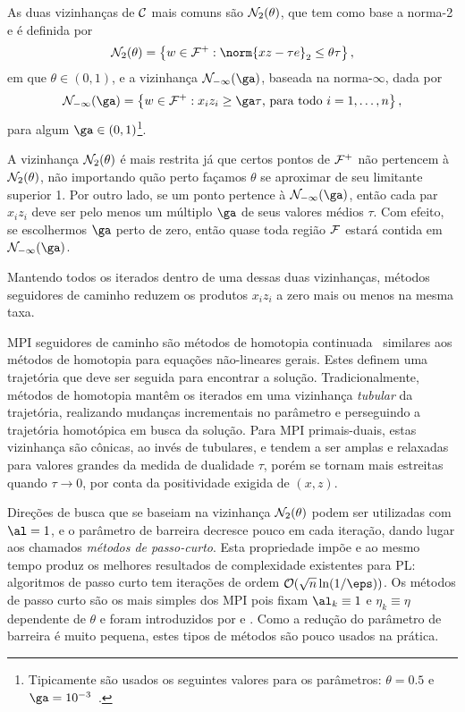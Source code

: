 As duas vizinhanças de $\mathcal{C}$ mais comuns são  $\mathcal{N}_2(\theta)$, que tem como base a norma-2 e é definida por
\[
\Nset_2(\theta) = \left\{w\in\Fset^+ : \norm{xz - \tau e}_2 \leq \theta\tau  
\right\},
\]
em que $\theta \in (0,1)$, e a vizinhança 
$\Nset_{-\infty}(\ga)$, baseada na norma-$\infty$, dada por 
\begin{equation}
\label{eq:infty-neig}
\Nset_{-\infty}(\ga) = \left\{w\in\Fset^+ : x_iz_i\geq \ga\tau\text{, para
todo }i =1,\dotsc,n \right\},
\end{equation}
para algum $\ga\in(0,1)$\footnote{Tipicamente são usados os seguintes valores 
para os parâmetros: $\theta = \num{0,5}$ e $\ga = \num{e-3}$~\cite[pg.
9]{Wright:Primal-dual-interior-point:1997h}.}.

A vizinhança $\mathcal{N}_2(\theta)$ é mais restrita já que certos pontos de $\mathcal{F}^+$
não pertencem à $\mathcal{N}_2(\theta)$, não importando quão perto façamos $\theta$ se
aproximar de seu limitante superior 1. Por outro lado, se um ponto pertence à
$\Nset_{-\infty}(\ga)$, então cada par $x_iz_i$ deve ser pelo menos um múltiplo
$\ga$ de seus valores médios $\tau$. Com efeito, se escolhermos $\ga$ perto de
zero, então quase toda região $\mathcal{F}$ estará contida em $\Nset_{-\infty}(\ga)$. 

Mantendo todos os iterados dentro de uma dessas duas vizinhanças, métodos
seguidores de caminho reduzem  os produtos $x_iz_i$ a zero mais ou menos na
mesma taxa.


\ac{MPI} seguidores de caminho são  métodos de homotopia
continuada~\cite{Nazareth:1986jg}
similares aos métodos de homotopia para equações não-lineares gerais. Estes
definem uma trajetória que
deve ser seguida para encontrar a solução. Tradicionalmente, métodos de
homotopia mantêm os iterados em uma vizinhança \emph{tubular} da trajetória, realizando mudanças
incrementais no parâmetro e perseguindo a trajetória homotópica em busca da
solução. Para \ac{MPI} primais-duais, estas vizinhança são cônicas, ao invés de
tubulares, e tendem a ser amplas e relaxadas  para valores grandes da medida de
dualidade $\tau$, porém se tornam mais estreitas quando $\tau\to0$, por conta da
positividade exigida de $(x,z)$.


 Direções de busca que se baseiam na vizinhança $\mathcal{N}_2(\theta)$ podem ser
 utilizadas com $\al=1$, e o parâmetro de barreira decresce pouco em cada
 iteração, dando lugar aos chamados \emph{métodos de passo-curto}. Esta
 propriedade impõe e ao mesmo tempo produz os melhores resultados de
 complexidade existentes para \ac{PL}: algoritmos de passo curto tem
 iterações de ordem $\Oset(\sqrt{n}\ln (1/\eps))$. Os métodos de passo curto
 são os mais simples dos \ac{MPI} pois fixam $\al_k\equiv  1$ e $\eta_k \equiv \eta$
 dependente de $\theta$ e foram introduzidos por
 \textcite{Kojima:1989fw} e \textcite{Monteiro:1989go}. Como a redução do
 parâmetro de barreira é muito pequena, estes tipos de métodos são pouco usados
 na prática.
   
